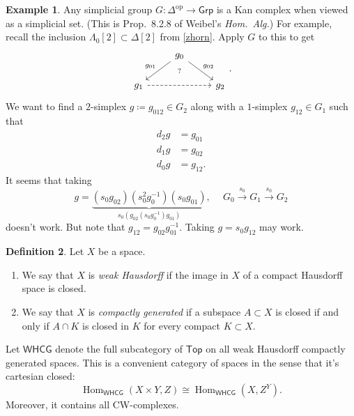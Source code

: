 \documentclass[10pt,letterpaper,cm]{nupset}
\theoremstyle{definition}
\newtheorem{defn}{Definition}[subsection]
\newtheorem{exmp}[defn]{Example}
\theoremstyle{theorem}
\theoremstyle{remark}
\newcommand{\1}{\mathbb{1}}
\newcommand{\0}{\vec 0}
\DeclareMathOperator{\Hom}{Hom}
\DeclareMathOperator{\op}{op}
\newcommand{\be}{\begin{enumerate}}
\newcommand{\ee}{\end{enumerate}}
\begin{document}
\begin{exmp}\label{simpgrp}
Any simplicial group $G : \Delta^{\op} \to \mathsf{Grp}$ is a Kan complex when viewed as a simplicial set. (This is Prop.\ 8.2.8 of Weibel's \textit{Hom.\ Alg.}) For example, recall the inclusion $\Lambda_0\left[2\right] \subset \Delta\left[2\right]$ from \cref{zhorn}. Apply $G$ to this to get
\[
\begin{tikzcd}
	& {g_{0}} \\
	{g_1} && {g_2}
	\arrow[""{name=0, anchor=center, inner sep=0}, "{g_{01}}"', from=1-2, to=2-1]
	\arrow[""{name=1, anchor=center, inner sep=0}, "{g_{02}}", from=1-2, to=2-3]
	\arrow[dashed, from=2-1, to=2-3]
	\arrow["{?}"', shift left=2, Rightarrow, draw=none, from=0, to=1]
\end{tikzcd}
.\] We want to find a $2$-simplex $g \coloneqq g_{012} \in G_2$ along with a $1$-simplex $g_{12} \in G_1$ such that
\begin{align*}
d_2{g} & = g_{01}
\\ d_1{g} & = g_{02}
\\ d_0{g} & = g_{12}.
\end{align*}
It seems that taking
\[
g = \underbrace{\left(s_0{g_{02}}\right)\left(s_0^2g_0^{-1}\right)\left(s_0g_{01}\right)}_{s_0\left(g_{02}\left(s_0 g_0^{-1}\right)g_{01}\right)}, \ \quad G_0 \xrightarrow{s_0} G_1 \xrightarrow{s_0} G_2
\] doesn't work. But note that $g_{12} =  g_{02}g_{01}^{-1}$. Taking $g= s_0{g_{12}}$ may work.
\end{exmp}


\bigskip

\begin{defn}
Let $X$ be a space.
\be
\item We say that $X$ is \textit{weak Hausdorff} if the image in $X$ of a compact Hausdorff space is closed.
\item We say that $X$ is \textit{compactly generated} if a subspace $A \subset X$ is closed if and only if $A \cap K$ is closed in $K$ for every compact $K \subset X$.
\ee
\end{defn}

Let $\mathsf{WHCG}$ denote the full subcategory of $\mathsf{Top}$ on all weak Hausdorff compactly generated spaces. This is a  convenient category of spaces in the sense that it's cartesian closed:
\[
\Hom_{\mathsf{WHCG}}(X \times Y, Z) \cong \Hom_{\mathsf{WHCG}}(X, Z^Y)
.\]
Moreover, it contains all CW-complexes. 
\end{document}
